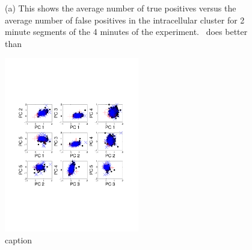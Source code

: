 \begin{figure}[htbp]
	\centering
	\caption{(a) This shows the average number of true positives versus the average number of false positives in the intracellular cluster for 2 minute segments of the 4 minutes of the experiment.  \smug\ does better than     }
	\label{fig:asdf}
\end{figure}


\begin{figure}[htbp]
	\centering
		\includegraphics[height=3in]{../figs/new/pairs.pdf}
	\caption{caption}
	\label{fig:pairs}
\end{figure}



